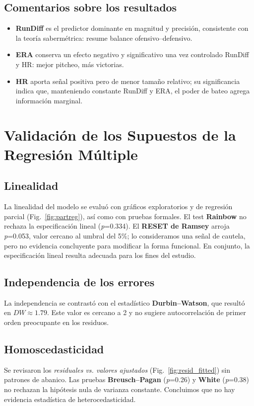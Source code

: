 \documentclass[man,floatsintext]{apa7}
\begin{document}
\subsection{Comentarios sobre los resultados}
\begin{itemize}
    \item \textbf{RunDiff} es el predictor dominante en magnitud y precisión, consistente con la teoría sabermétrica: resume balance ofensivo--defensivo.
    \item \textbf{ERA} conserva un efecto negativo y significativo una vez controlado RunDiff y HR: mejor pitcheo, más victorias.
    \item \textbf{HR} aporta señal positiva pero de menor tamaño relativo; su significancia indica que, manteniendo constante RunDiff y ERA, el poder de bateo agrega información marginal.
\end{itemize}
\section{Validación de los Supuestos de la Regresión Múltiple}
%
\subsection{Linealidad}
La linealidad del modelo se evaluó con gráficos exploratorios y de regresión parcial (Fig.~\ref{fig:partreg}), así como con pruebas formales. El test \textbf{Rainbow} no rechaza la especificación lineal (\emph{p}=0.334). El \textbf{RESET de Ramsey} arroja \emph{p}=0.053, valor cercano al umbral del 5\%; lo consideramos una señal de cautela, pero no evidencia concluyente para modificar la forma funcional. En conjunto, la especificación lineal resulta adecuada para los fines del estudio.

\subsection{Independencia de los errores}
La independencia se contrastó con el estadístico \textbf{Durbin--Watson}, que resultó en \(DW\approx1.79\). Este valor es cercano a 2 y no sugiere autocorrelación de primer orden preocupante en los residuos.

\subsection{Homoscedasticidad}
Se revisaron los \emph{residuales vs. valores ajustados} (Fig.~\ref{fig:resid_fitted}) sin patrones de abanico. Las pruebas \textbf{Breusch--Pagan} (\emph{p}=0.26) y \textbf{White} (\emph{p}=0.38) no rechazan la hipótesis nula de varianza constante. Concluimos que no hay evidencia estadística de heterocedasticidad.
\end{document}
